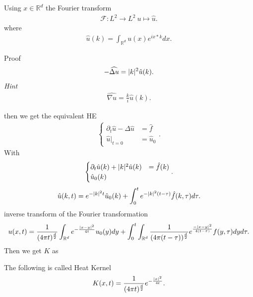 Using  $x \in  \mathbb{R}^{d} $ the Fourier transform 
\begin{align*}
  \mathcal{F} : L^2 \to  L^2 \ u \mapsto \hat{u} 
.\end{align*}
where
\begin{align*}
  \hat{u} (k) = \int_{\mathbb{R}^{d} } u(x) e^{ix*k}  dx 
.\end{align*}
\begin{exercise}
  Proof
\begin{align*}
  - \widehat{\Delta u}  = \lvert k\rvert^2 \hat{u}(k)
.\end{align*}
\textit{Hint} 
\begin{align*}
  \widehat{\nabla u} = \frac{k}{i} \hat{u}(k)
.\end{align*}
\end{exercise}
then we get the equivalent HE 
 \begin{align*}
  \begin{cases}
    \partial_t \hat{u} - \Delta \hat{u} &=\hat{f}\\
   \hat{u} \rvert_{t=0} &= \hat{u}_0
 \end{cases} 
 .\end{align*}
 With 
 \begin{align*}
   \begin{cases}
     \partial_t \hat{u}(k)  + \lvert k\rvert^2 \hat{u} (k) &= \hat{f}(k) \\
     \hat{u}_0(k)
   \end{cases}
 .\end{align*}
 \begin{align*}
  \hat{u} (k,t)= e^{-\lvert k\rvert^2t} \hat{u}_0(k) + \int_0^{t}  e^{-\lvert k\rvert^2(t-\tau )} \hat{f}(k,\tau ) d \tau 
 .\end{align*}
 inverse transform of the Fourier transformation
 \begin{align*}
   u(x,t) =  \frac{1}{(4\pi t)^{\frac{d}{2}} }\int_{\mathbb{R}^{d} } e^{-\frac{\lvert x-y\rvert^2}{4t}} u_0(y) dy + \int_0^{t} \int_{\mathbb{R}^{d} }   \frac{1}{(4\pi(t-\tau ))^{\frac{d}{2}} } e^{\frac{-\lvert x-y\rvert^2}{4(t-\tau )}} f(y,\tau )dy d\tau 
 .\end{align*}
 Then we get $K$ as 
 \begin{definition}
 The following is called Heat Kernel
 \begin{align*}
  K(x,t) = \frac{1}{(4\pi t)^{\frac{d}{2}} } e^{-\frac{\lvert x\rvert^2}{4t}} 
 .\end{align*}
 \end{definition}
